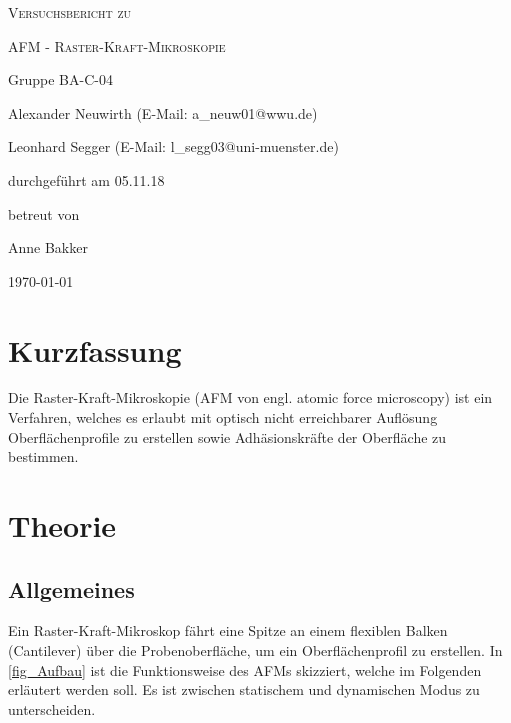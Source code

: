 \documentclass[
	a4paper,
	12pt,
	pagesize,
	ngerman
]{scrartcl}
\begin{document}
	\begin{titlepage}
		\centering
		{\scshape\LARGE Versuchsbericht zu \par}
		\vspace{1cm}
		{\scshape\huge AFM - Raster-Kraft-Mikroskopie \par}
		\vspace{2.5cm}
		{\LARGE Gruppe BA-C-04 \par}
		\vspace{0.5cm}

		{\large Alexander Neuwirth (E-Mail: a\_neuw01@wwu.de) \par}
		{\large Leonhard Segger (E-Mail: l\_segg03@uni-muenster.de) \par}
		\vfill

		durchgeführt am 05.11.18\par
		betreut von\par
		{\large Anne Bakker}

		\vfill

		{\large \today\par}
	\end{titlepage}
	\tableofcontents
	\newpage


	\section{Kurzfassung}
	Die Raster-Kraft-Mikroskopie (AFM von engl. atomic force microscopy) ist ein Verfahren, welches es erlaubt mit optisch nicht erreichbarer Auflösung Oberflächenprofile zu erstellen sowie Adhäsionskräfte der Oberfläche zu bestimmen. %

	\section{Theorie}
	\label{sec_theorie}

	\subsection{Allgemeines}
	Ein Raster-Kraft-Mikroskop fährt eine Spitze an einem flexiblen Balken (Cantilever) über die Probenoberfläche, um ein Oberflächenprofil zu erstellen.
	In \cref{fig_Aufbau} ist die Funktionsweise des AFMs skizziert, welche im Folgenden erläutert werden soll.
	Es ist zwischen statischem und dynamischen Modus zu unterscheiden.
\end{document}
